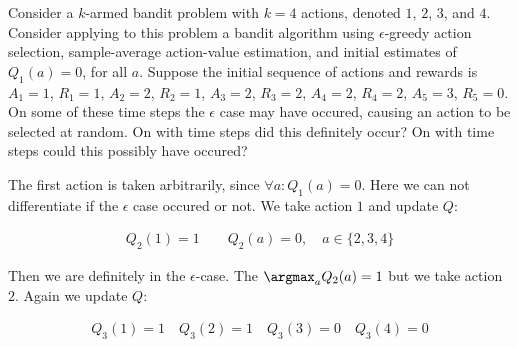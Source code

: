 \begin{exercise}
Consider a $k$-armed bandit problem with $k = 4$ actions, denoted $1$, $2$, $3$, and $4$.
Consider applying to this problem a bandit algorithm using $\epsilon$-greedy action selection, sample-average action-value estimation, and initial estimates of $Q_1(a) = 0$, for all $a$.
Suppose the initial sequence of actions and rewards is $A_1 = 1$, $R_1 = 1$, $A_2 = 2$, $R_2 = 1$, $A_3 = 2$, $R_3 = 2$, $A_4 = 2$, $R_4 = 2$, $A_5 = 3$, $R_5 = 0$.
On some of these time steps the $\epsilon$ case may have occured, causing an action to be selected at random.
On with time steps did this definitely occur?
On with time steps could this possibly have occured?
\end{exercise}

\begin{solution}
The first action is taken arbitrarily, since $\forall a: Q_1(a)=0$. Here we can not differentiate if the $\epsilon$ case occured or not. We take action $1$ and update $Q$:

\begin{align*}
  Q_2(1) = 1
  \qquad
  Q_2(a) = 0, \quad a \in \{2,3,4\}
\end{align*}

Then we are definitely in the $\epsilon$-case. The $\argmax_a Q_2(a) = 1$ but we take action $2$. Again we update $Q$:

\begin{align*}
  Q_3(1) = 1
  \quad
  Q_3(2) = 1
  \quad
  Q_3(3) = 0
  \quad
  Q_3(4) = 0
\end{align*}


\end{solution}
